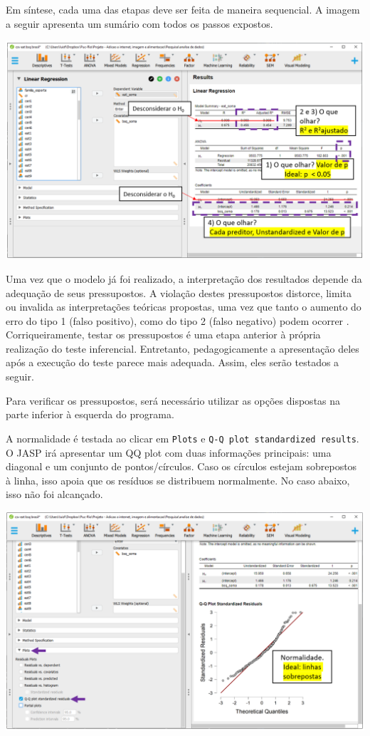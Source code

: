 \documentclass[
]{book}
\begin{document}
Em síntese, cada uma das etapas deve ser feita de maneira sequencial. A imagem a seguir apresenta um sumário com todos os passos expostos.

\includegraphics{./img/cap_reg_resultados_juntos.png}

Uma vez que o modelo já foi realizado, a interpretação dos resultados depende da adequação de seus pressupostos. A violação destes pressupostos distorce, limita ou invalida as interpretações teóricas propostas, uma vez que tanto o aumento do erro do tipo 1 (falso positivo), como do tipo 2 (falso negativo) podem ocorrer \citep{Lix1996, Barker2015, Ernst2017}. Corriqueiramente, testar os pressupostos é uma etapa anterior à própria realização do teste inferencial. Entretanto, pedagogicamente a apresentação deles após a execução do teste parece mais adequada. Assim, eles serão testados a seguir.

Para verificar os pressupostos, será necessário utilizar as opções dispostas na parte inferior à esquerda do programa.

A normalidade é testada ao clicar em \texttt{Plots} e \texttt{Q-Q\ plot\ standardized\ results}. O JASP irá apresentar um QQ plot com duas informações principais: uma diagonal e um conjunto de pontos/círculos. Caso os círculos estejam sobrepostos à linha, isso apoia que os resíduos se distribuem normalmente. No caso abaixo, isso não foi alcançado.

\includegraphics{./img/cap_reg_normalidade.png}
\end{document}
